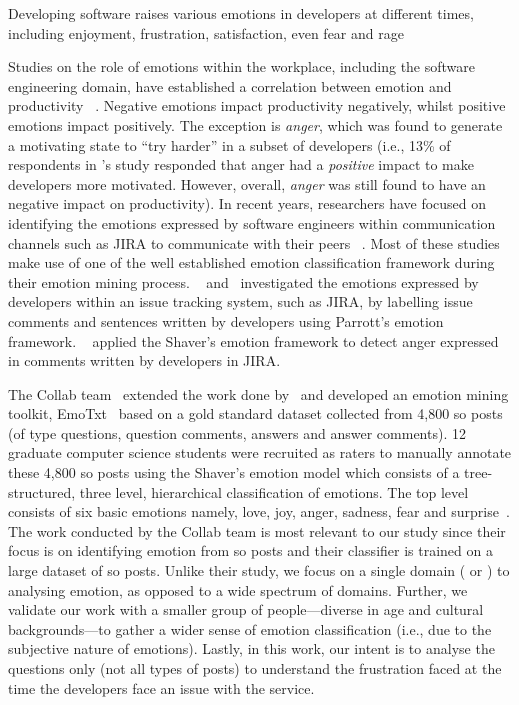 Developing software raises various emotions in developers at different times, including enjoyment, frustration, satisfaction, even fear and rage \cite{wrobel2013,ortu2016,wrobel2020,calefato2017}

Studies on the role of emotions within the workplace, including the software engineering domain, have established a correlation between emotion and productivity ~\citep{wrobel2013, wrobel2020}. Negative emotions impact productivity negatively, whilst positive emotions impact positively. The exception is \textit{anger}, which was found to generate a motivating state to ``try harder'' in a subset of developers (i.e., 13\% of respondents in \citeauthor{wrobel2013}'s study \citep{wrobel2013} responded that anger had a \textit{positive} impact to make developers more motivated.  However, overall, \textit{anger} was still found to have an negative impact on productivity). In recent years, researchers have focused on identifying the emotions expressed by software engineers within communication channels such as JIRA to communicate with their peers ~\citep{murgia2014, ortu2016, gachechiladze2017, novielli2018}. Most of these studies make use of one of the well established emotion classification framework during their emotion mining process. ~\citet{murgia2014} and~\citet{ortu2016} investigated the emotions expressed by developers within an issue tracking system, such as JIRA, by labelling issue comments and sentences written by developers using Parrott's emotion framework. ~\citet{gachechiladze2017} applied the Shaver's emotion framework to detect anger expressed in comments written by developers in JIRA. 

The Collab team~\citep{calefato2017, novielli2018} extended the work done by~\citet{ortu2016} and developed an emotion mining toolkit, EmoTxt~\citep{calefato2017} based on a gold standard dataset collected from 4,800 \gls{so} posts (of type questions, question comments, answers and answer comments). 12 graduate computer science students were recruited as raters to manually annotate these 4,800 \gls{so} posts using the Shaver's emotion model which consists of a tree-structured, three level, hierarchical classification of emotions. The top level consists of six basic emotions namely, love, joy, anger, sadness, fear and surprise~\citep{shaver1987}. The work conducted by the Collab team is most relevant to our study since their focus is on identifying emotion from \gls{so} posts and their classifier is trained on a large dataset of \gls{so} posts. Unlike their study, we focus on a single domain ( or ) to analysing emotion, as opposed to a wide spectrum of domains. Further, we validate our work with a smaller group of people---diverse in age and cultural backgrounds---to gather a wider sense of emotion classification (i.e., due to the subjective nature of emotions). Lastly, in this work, our intent is to analyse the questions only (not all types of posts) to understand the frustration faced at the time the developers face an issue with the service.

